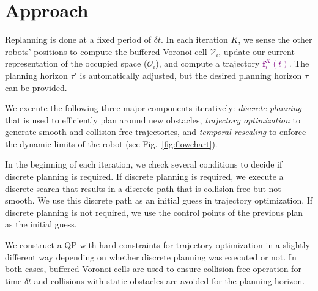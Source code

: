 \documentclass{svproc}
\newcommand{\vf}{\mathbf{f}}
\newcommand{\cV}{\mathcal{V}}
\newcommand{\cO}{\mathcal{O}}
\newcommand{\changed}[1]{\textcolor{purple}{#1}}
\begin{document}

\section{Approach}


Replanning is done at a fixed period of $\delta t$.
In each iteration $K$, we sense the other robots' positions to compute the buffered Voronoi cell $\cV_i$, update our current representation of the occupied space ($\cO_i$), and compute a trajectory \changed{$\vf^K_i(t)$}.
The planning horizon $\tau'$ is automatically adjusted, but the desired planning horizon $\tau$ can be provided.



We execute the following three major components iteratively: \emph{discrete planning} that is used to efficiently plan around new obstacles, \emph{trajectory optimization} to generate smooth and collision-free trajectories, and \emph{temporal rescaling} to enforce the dynamic limits of the robot (see Fig.~\ref{fig:flowchart}).

In the beginning of each iteration, we check several conditions to decide if discrete planning is required.
If discrete planning is required, we execute a discrete search that results in a discrete path that is collision-free but not smooth.
We use this discrete path as an initial guess in trajectory optimization.
If discrete planning is not required, we use the control points of the previous plan as the initial guess.

We construct a QP with hard constraints for trajectory optimization in a slightly different way depending on whether discrete planning was executed or not.
In both cases, buffered Voronoi cells are used to ensure collision-free operation for time $\delta t$ and collisions with static obstacles are avoided for the planning horizon.
\end{document}

